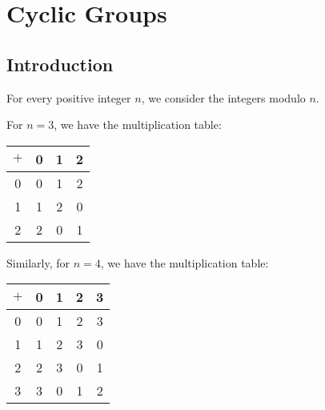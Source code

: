 \chapter{Cyclic Groups}

\section{Introduction}

For every positive integer $n$, we consider the integers modulo $n$. 

\begin{example}
    For $n = 3$, we have the multiplication table:

    \begin{minipage}[h]{0.45\linewidth} \begin{center}
        \begin{tabular}{c|c|c|c}
            $+$ & 0 & 1 & 2 \\ \hline
            0   & 0 & 1 & 2 \\ \hline
            1   & 1 & 2 & 0 \\ \hline
            2   & 2 & 0 & 1
        \end{tabular}
    \end{center} \end{minipage}
    \begin{minipage}[h]{0.45\linewidth} \begin{center}
    \end{center} \end{minipage}

    Similarly, for $n = 4$, we have the multiplication table:

    \begin{table}[ht!]
        \centering
        \begin{tabular}{c|c|c|c|c}
            $+$ & 0 & 1 & 2 & 3 \\ \hline
            0   & 0 & 1 & 2 & 3 \\ \hline
            1   & 1 & 2 & 3 & 0 \\ \hline
            2   & 2 & 3 & 0 & 1 \\ \hline
            3   & 3 & 0 & 1 & 2
        \end{tabular}
    \end{table}
\end{example}

